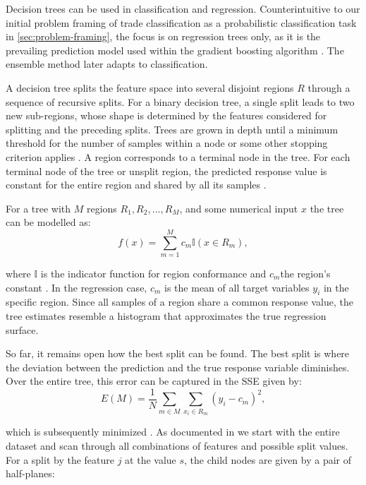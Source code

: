 Decision trees can be used in classification and regression. Counterintuitive to our initial problem framing of trade classification as a probabilistic classification task in \cref{sec:problem-framing}, the focus is on regression trees only, as it is the prevailing prediction model used within the gradient boosting algorithm \autocite[][9]{friedmanAdditiveLogisticRegression2000}. The ensemble method later adapts to classification.

A decision tree splits the feature space into several disjoint regions $R$ through a sequence of recursive splits. For a binary decision tree, a single split leads to two new sub-regions, whose shape is determined by the features considered for splitting and the preceding splits. Trees are grown in depth until a minimum threshold for the number of samples within a node or some other stopping criterion applies \autocite[][42]{breimanClassificationRegressionTrees2017}.
A region corresponds to a terminal node in the tree. For each terminal node of the tree or unsplit region, the predicted response value is constant for the entire region and shared by all its samples \autocite[][229]{breimanClassificationRegressionTrees2017}.

For a tree with $M$ regions $R_1, R_2,\ldots, R_M$, and some numerical input $x$ the tree can be modelled as:
\begin{equation}
    f(x)=\sum_{m=1}^{M} c_{m} \mathbb{I}\left(x \in R_{m}\right),
    \label{eq:decision-tree}
\end{equation}

where $\mathbb{I}$ is the indicator function for region conformance and $c_m$the region's constant \autocite[][326]{hastietrevorElementsStatisticalLearning2009}. In the regression case, $c_m$ is the mean of all target variables $y_i$ in the specific region. Since all samples of a region share a common response value, the tree estimates resemble a histogram that approximates the true regression surface.

So far, it remains open how the best split can be found. The best split is where the deviation between the prediction and the true response variable diminishes. Over the entire tree, this error can be captured in the \gls{SSE} given by:
\begin{equation}
    E(M)=\frac{1}{N} \sum_{m \in M} \sum_{x_{i} \in R_m}\left(y_{i}-c_{m}\right)^{2},
\end{equation}

which is subsequently minimized \textcite[][231]{breimanClassificationRegressionTrees2017}. As documented in \textcite[][326]{hastietrevorElementsStatisticalLearning2009} we start with the entire dataset and scan through all combinations of features and possible split values. For a split by the feature $j$ at the value $s$, the child nodes are given by a pair of half-planes:

